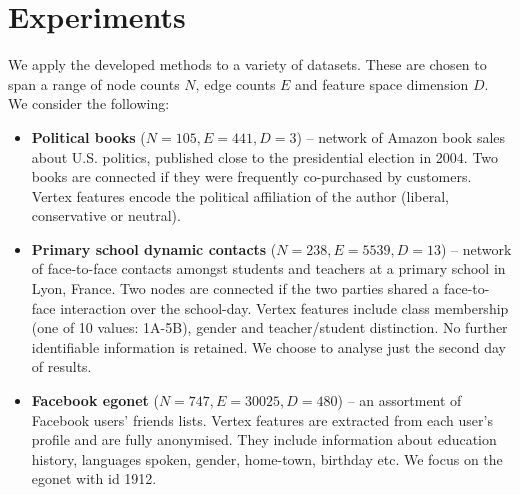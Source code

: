 \section{Experiments}
\label{sec:experiments}

We apply the developed methods to a variety of datasets. These are chosen to span a range of node counts $N$, edge counts $E$ and feature space dimension $D$. We consider the following:

\begin{itemize}[leftmargin=*]
	\item \textbf{Political books} \cite{polbooks} ($N=105, E=441, D=3$) -- network of Amazon book sales about U.S. politics, published close to the presidential election in 2004. Two books are connected if they were frequently co-purchased by customers. Vertex features encode the political affiliation of the author (liberal, conservative or neutral).
		
	\item \textbf{Primary school dynamic contacts} \cite{schools} ($N=238, E=5539, D=13$) -- network of face-to-face contacts amongst students and teachers at a primary school in Lyon, France. Two nodes are connected if the two parties shared a face-to-face interaction over the school-day. Vertex features include class membership (one of 10 values: 1A-5B), gender and teacher/student distinction. No further identifiable information is retained. We choose to analyse just the second day of results.
	
	\item \textbf{Facebook egonet} \cite{fb-snap} ($N=747, E=30025, D=480$) -- an assortment of Facebook users' friends lists. Vertex features are extracted from each user's profile and are fully anonymised. They include information about education history, languages spoken, gender, home-town, birthday etc. We focus on the egonet with id 1912.

\end{itemize}

